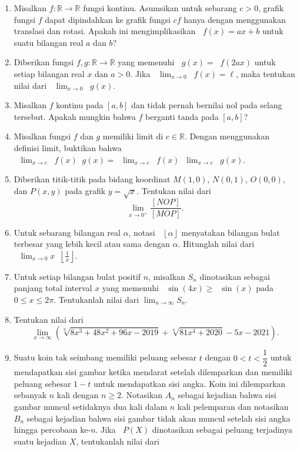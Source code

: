 \documentclass[12pt]{article}
\newcommand*\floor[1]{\mathop{}\!\left\lfloor{#1}\right\rfloor}
\newcommand*\func[2]{\mathop{}\!{#1}{\left({#2}\right)}}
\newcommand*\ds[1]{\mathop{}\!\displaystyle{{#1}}}
\begin{document}
\begin{enumerate}[leftmargin=*]
		\item Misalkan $ f : \mathbb{R} \to \mathbb{R} $ fungsi kontinu. Asumsikan untuk sebarang $ c > 0 $, grafik fungsi $ f $ dapat dipindahkan ke grafik fungsi $ cf $ hanya dengan menggunakan translasi dan rotasi. Apakah ini mengimplikasikan $ \func{f}{x} = ax + b $ untuk suatu bilangan real $ a $ dan $ b $?
		\item Diberikan fungsi $ f, g : \mathbb{R} \to \mathbb{R} $ yang memenuhi $ \func{g}{x} = \func{f}{2ax} $ untuk setiap bilangan real $ x $ dan $ a > 0 $. Jika $ \ds{\lim_{x \to 0}{\func{f}{x}}} = \ell $, maka tentukan nilai dari $ \ds{\lim_{x \to 0}{\func{g}{x}}} $.
		\item Misalkan $ f $ kontinu pada $ \left[a, b\right] $ dan tidak pernah bernilai nol pada selang tersebut. Apakah mungkin bahwa $ f $ berganti tanda pada $ \left[a, b\right] $?
		\item Misalkan fungsi $ f $ dan $ g $ memiliki limit di $ c \in \mathbb{R} $. Dengan menggunakan definisi limit, buktikan bahwa $ \ds{\lim_{x \to c}{\func{f}{x}\func{g}{x}}} = \ds{\lim_{x \to c}{\func{f}{x}}}\ds{\lim_{x \to c}{\func{g}{x}}} $.
		\item Diberikan titik-titik pada bidang koordinat $ M\left(1, 0\right) $, $ N\left(0, 1\right) $, $ O\left(0, 0\right) $, dan $ P\left(x, y\right) $ pada grafik $ y = \sqrt{x} $. Tentukan nilai dari
		\[ \lim_{x \to 0^{+}}{\frac{\left[NOP\right]}{\left[MOP\right]}}. \]
		\item Untuk sebarang bilangan real $ \alpha $, notasi $ \floor{\alpha} $ menyatakan bilangan bulat terbesar yang lebih kecil atau sama dengan $ \alpha $. Hitunglah nilai dari $ \ds{\lim_{x \to 0}{x\floor{\frac{1}{x}}}} $.
		\item Untuk setiap bilangan bulat positif $ n $, misalkan $ S_{n} $ dinotasikan sebagai panjang total interval $ x $ yang memenuhi $ \func{\sin}{4x} \geq \func{\sin}{x} $ pada $ 0 \leq x \leq 2\pi $. Tentukanlah nilai dari $ \displaystyle{\lim_{n \to \infty}{S_{n}}} $.
		\item Tentukan nilai dari
		\[ \lim_{x \to \infty}{\left(\sqrt[3]{8x^{3} + 48x^{2} + 96x - 2019} + \sqrt[4]{81x^{4} + 2020} - 5x - 2021\right)}. \]
		\item Suatu koin tak seimbang memiliki peluang sebesar $ t $ dengan $ 0 < t < \dfrac{1}{2} $ untuk mendapatkan sisi gambar ketika mendarat setelah dilemparkan dan memiliki peluang sebesar $ 1 - t $ untuk mendapatkan sisi angka. Koin ini dilemparkan sebanyak $ n $ kali dengan $ n \geq 2 $. Notasikan $ A_{n} $ sebagai kejadian bahwa sisi gambar muncul setidaknya dua kali dalam $ n $ kali pelemparan dan notasikan $ B_{n} $ sebagai kejadian bahwa sisi gambar tidak akan muncul setelah sisi angka hingga percobaan ke-$ n $. Jika $ \func{P}{X} $ dinotasikan sebagai peluang terjadinya suatu kejadian $ X $, tentukanlah nilai dari

\end{enumerate}
\end{document}
